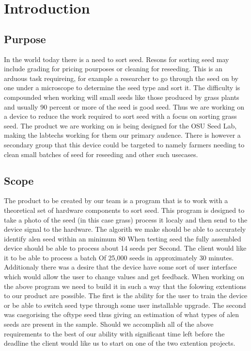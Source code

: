 \documentclass[onecolumn, draftclsnofoot,10pt, compsoc]{IEEEtran}
\begin{document}

\section{Introduction}

\subsection{Purpose}
In the world today there is a need to sort seed.
Resons for sorting seed may include grading for pricing pourposes or cleaning for reseeding.
This is an arduous task requireing, for example a researcher to go through the seed on by one under a microscope to determine the seed type and sort it.
The difficulty is compounded when working will small seeds like those produced by grass plants and usually 90 percent or more of the seed is good seed.
Thus we are working on a device to reduce the work required to sort seed with a focus on sorting grass seed.
The product we are working on is being designed for the OSU Seed Lab, making the labtechs working for them our primary audence.
There is however a secondary group that this device could be targeted to namely farmers needing to clean small batches of seed for reseeding and other such usecases.

\subsection{Scope}
The product to be created by our team is a program that is to work with a theoretical set of hardware components to sort seed.
This program is designed to take a photo of the seed (in this case grass) process it localy and then send to the device signal to the hardware.
The algorith we make should be able to accurately identify alen seed within an minimum 80%
When testing seed the fully assembled device should be able to process about 14 seeds per Second.
The client would like it to be able to process a batch Of 25,000 seeds in approximately 30 minutes.
Additionaly there was a desire that the device have some sort of user interface which would allow the user to change values and get feedback.
When working on the above program we need to build it in such a way that the folowing extentions to our product are possible.
The first is the ability for the user to train the device or be able to switch seed type through some user installable upgrade.
The second was caegorising the oftype seed thus giving an estimation of what types of alen seeds are present in the sample.
Should we accomplish all of the above requirements to the best of our ability with significant time left before the deadline the client would like us to start on one of the two extention projects.
\end{document}
